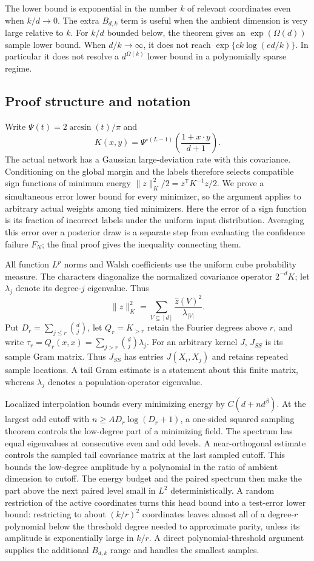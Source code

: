 \documentclass[11pt]{article}
\theoremstyle{remark}\newtheorem{remark}[theorem]{Remark}
\begin{document}
The lower bound is exponential in the number $k$ of relevant
coordinates even when $k/d\to0$. The extra $B_{d,k}$ term is useful
when the ambient dimension is very large relative to $k$.
For $k/d$ bounded below, the theorem gives an $\exp(\Omega(d))$
sample lower bound. When $d/k\to\infty$, it does not reach
$\exp\{c k\log(ed/k)\}$. In particular it does not resolve a
$d^{\Omega(k)}$ lower bound in a polynomially sparse regime.

\subsection{Proof structure and notation}
Write $\Psi(t)=2\arcsin(t)/\pi$ and
\[
 K(x,y)=\Psi^{\circ(L-1)}\!\left(\frac{1+x\cdot y}{d+1}\right).
\]
The actual network has a Gaussian large-deviation rate with this
covariance. Conditioning on the global margin and the labels therefore
selects compatible sign functions of minimum energy
$\|z\|_K^2/2=z^{\mathsf T}K^{-1}z/2$.
We prove a simultaneous error lower bound for every minimizer, so the
argument applies to arbitrary actual weights among tied minimizers.
Here the error of a sign function is its fraction of incorrect labels
under the uniform input distribution. Averaging this error over a
posterior draw is a separate step from evaluating the confidence
failure $F_N$; the final proof gives the inequality connecting them.

All function $L^p$ norms and Walsh coefficients use the uniform cube
probability measure. The characters diagonalize the normalized
covariance operator $2^{-d}K$; let $\lambda_j$ denote its degree-$j$
eigenvalue. Thus
\[
 \|z\|_K^2=\sum_{V\subseteq[d]}
             \frac{\widehat z(V)^2}{\lambda_{|V|}}.
\]
Put $D_r=\sum_{j\le r}\binom dj$, let $Q_r=K_{>r}$ retain the Fourier
degrees above $r$, and write
$\tau_r=Q_r(x,x)=\sum_{j>r}\binom dj\lambda_j$.
For an arbitrary kernel $J$, $J_{SS}$ is its sample Gram matrix.
Thus $J_{SS}$ has entries $J(X_i,X_j)$ and retains repeated sample
locations. A tail Gram estimate is a statement about this finite matrix,
whereas $\lambda_j$ denotes a population-operator eigenvalue.

Localized interpolation bounds every minimizing energy by
$C(d+n d^\beta)$. At the largest odd cutoff with
$n\ge A D_r\log(D_r+1)$, a one-sided squared sampling theorem controls
the low-degree part of a minimizing field.
The spectrum has equal eigenvalues at consecutive even and odd levels.
A near-orthogonal estimate controls the sampled tail covariance matrix
at the last sampled cutoff. This bounds the low-degree amplitude by a
polynomial in the ratio of ambient dimension to cutoff. The energy budget
and the paired spectrum then make the part above the next paired level
small in $L^2$ deterministically.
A random restriction of the active coordinates turns this head bound
into a test-error lower bound: restricting to about $(k/r)^2$ coordinates
leaves almost all of a degree-$r$ polynomial below the threshold degree
needed to approximate parity, unless its amplitude is exponentially
large in $k/r$. A direct polynomial-threshold argument supplies the
additional $B_{d,k}$ range and handles the smallest samples.
\end{document}
